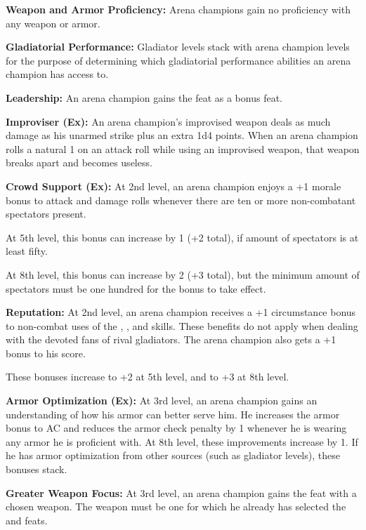 {
\textbf{Weapon and Armor Proficiency:} Arena champions gain no proficiency with any weapon or armor.

\textbf{Gladiatorial Performance:} Gladiator levels stack with arena champion levels for the purpose of determining which gladiatorial performance abilities an arena champion has access to.

\textbf{Leadership:} An arena champion gains the  feat as a bonus feat.

\textbf{Improviser (Ex):} An arena champion's improvised weapon deals as much damage as his unarmed strike plus an extra 1d4 points. When an arena champion rolls a natural 1 on an attack roll while using an improvised weapon, that weapon breaks apart and becomes useless.

\textbf{Crowd Support (Ex):} At 2nd level, an arena champion enjoys a +1 morale bonus to attack and damage rolls whenever there are ten or more non-combatant spectators present. 

At 5th level, this bonus can increase by 1 (+2 total), if amount of spectators is at least fifty.

At 8th level, this bonus can increase by 2 (+3 total), but the minimum amount of spectators must be one hundred for the bonus to take effect.

\textbf{Reputation:} At 2nd level, an arena champion receives a +1 circumstance bonus to non-combat uses of the , ,  and  skills. These benefits do not apply when dealing with the devoted fans of rival gladiators. The arena champion also gets a +1 bonus to his  score.

These bonuses increase to +2 at 5th level, and to +3 at 8th level.

\textbf{Armor Optimization (Ex):} At 3rd level, an arena champion gains an understanding of how his armor can better serve him. He increases the armor bonus to AC and reduces the armor check penalty by 1 whenever he is wearing any armor he is proficient with. At 8th level, these improvements increase by 1. If he has armor optimization from other sources (such as gladiator levels), these bonuses stack.

\textbf{Greater Weapon Focus:} At 3rd level, an arena champion gains the  feat with a chosen weapon. The weapon must be one for which he already has selected the  and  feats.

}
